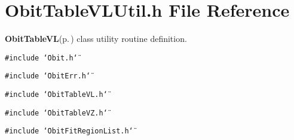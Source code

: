 \section{Obit\-Table\-VLUtil.h File Reference}
\label{ObitTableVLUtil_8h}
{\bf Obit\-Table\-VL}{\rm (p.\,\pageref{structObitTableVL})} class utility routine definition. 

{\tt \#include \char`\"{}Obit.h\char`\"{}}\par
{\tt \#include \char`\"{}Obit\-Err.h\char`\"{}}\par
{\tt \#include \char`\"{}Obit\-Table\-VL.h\char`\"{}}\par
{\tt \#include \char`\"{}Obit\-Table\-VZ.h\char`\"{}}\par
{\tt \#include \char`\"{}Obit\-Fit\-Region\-List.h\char`\"{}}\par
